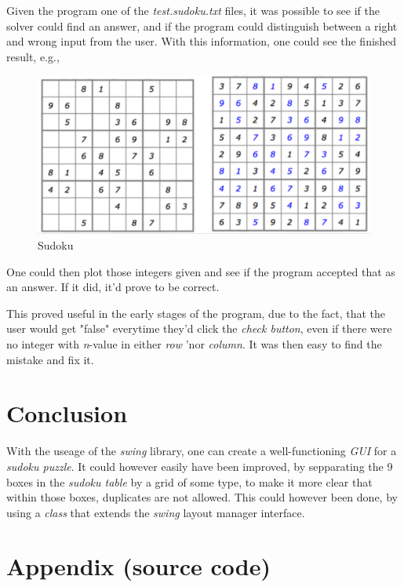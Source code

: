 \documentclass[a4paper,10pt]{article}
\begin{document}
Given the program one of the \textit{test.sudoku.txt} files, it was possible to see if the solver could find an answer, and if the program could distinguish between a right and wrong input from the user. With this information, one could see the finished result, e.g.,

\begin{figure}[htp]\center
\includegraphics[scale=0.2]{sudoku.png}
\caption{Sudoku}
\end{figure}

One could then plot those integers given and see if the program accepted that as an answer. If it did, it'd prove to be correct.

This proved useful in the early stages of the program, due to the fact, that the user would get "false" everytime they'd click the \textit{check button}, even if there were no integer with \textit{n}-value in either \textit{row} 'nor \textit{column}. It was then easy to find the mistake and fix it.

\section{Conclusion} 
With the useage of the \textit{swing} library, one can create a well-functioning \textit{GUI} for a \textit{sudoku puzzle}. It could however easily have been improved, by sepparating the 9 boxes in the \textit{sudoku table} by a grid of some type, to make it more clear that within those boxes, duplicates are not allowed. This could however been done, by using a \textit{class} that extends the \textit{swing} layout manager interface.

\newpage

\section{Appendix (source code)}
\end{document}

